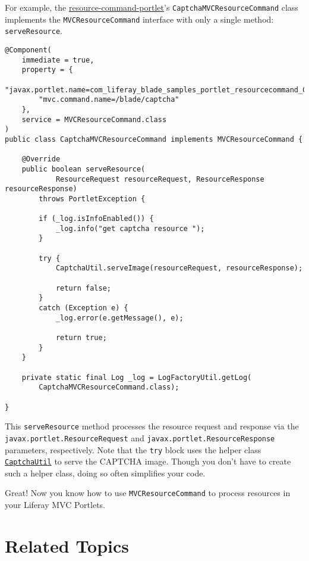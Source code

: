 For example, the
\href{https://github.com/liferay/liferay-blade-samples/tree/7.1/gradle/apps/resource-command-portlet}{resource-command-portlet}'s
\texttt{CaptchaMVCResourceCommand} class implements the
\texttt{MVCResourceCommand} interface with only a single method:
\texttt{serveResource}.

\begin{verbatim}
@Component(
    immediate = true,
    property = {
        "javax.portlet.name=com_liferay_blade_samples_portlet_resourcecommand_CaptchaPortlet",
        "mvc.command.name=/blade/captcha"
    },
    service = MVCResourceCommand.class
)
public class CaptchaMVCResourceCommand implements MVCResourceCommand {

    @Override
    public boolean serveResource(
            ResourceRequest resourceRequest, ResourceResponse resourceResponse)
        throws PortletException {

        if (_log.isInfoEnabled()) {
            _log.info("get captcha resource ");
        }

        try {
            CaptchaUtil.serveImage(resourceRequest, resourceResponse);

            return false;
        }
        catch (Exception e) {
            _log.error(e.getMessage(), e);

            return true;
        }
    }

    private static final Log _log = LogFactoryUtil.getLog(
        CaptchaMVCResourceCommand.class);

}
\end{verbatim}

This \texttt{serveResource} method processes the resource request and
response via the \texttt{javax.portlet.ResourceRequest} and
\texttt{javax.portlet.ResourceResponse} parameters, respectively. Note
that the \texttt{try} block uses the helper class
\href{https://docs.liferay.com/dxp/portal/7.2-latest/javadocs/portal-kernel/com/liferay/portal/kernel/captcha/CaptchaUtil.html}{\texttt{CaptchaUtil}}
to serve the CAPTCHA image. Though you don't have to create such a
helper class, doing so often simplifies your code.

Great! Now you know how to use \texttt{MVCResourceCommand} to process
resources in your Liferay MVC Portlets.

\section{Related Topics}\label{related-topics-8}

